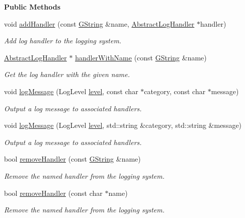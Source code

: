 \begin{Indent}\textbf{ Public Methods}\par
\begin{DoxyCompactItemize}
\item 
void \mbox{\hyperlink{classrev_1_1_logger_a3079f8111b72c4104c9fd23761515646}{add\+Handler}} (const \mbox{\hyperlink{classrev_1_1_g_string}{G\+String}} \&name, \mbox{\hyperlink{classrev_1_1_abstract_log_handler}{Abstract\+Log\+Handler}} $\ast$handler)
\begin{DoxyCompactList}\small\item\em Add log handler to the logging system. \end{DoxyCompactList}\item 
\mbox{\hyperlink{classrev_1_1_abstract_log_handler}{Abstract\+Log\+Handler}} $\ast$ \mbox{\hyperlink{classrev_1_1_logger_a2434316a6f883204891525ea7cdfa769}{handler\+With\+Name}} (const \mbox{\hyperlink{classrev_1_1_g_string}{G\+String}} \&name)
\begin{DoxyCompactList}\small\item\em Get the log handler with the given name. \end{DoxyCompactList}\item 
void \mbox{\hyperlink{classrev_1_1_logger_a4d30225c80b39e4ff5e9e77640994e1c}{log\+Message}} (Log\+Level \mbox{\hyperlink{classrev_1_1_logger_a9fb93878a5b8e3e9367078a1446128b2}{level}}, const char $\ast$category, const char $\ast$message)
\begin{DoxyCompactList}\small\item\em Output a log message to associated handlers. \end{DoxyCompactList}\item 
void \mbox{\hyperlink{classrev_1_1_logger_a2bfdc837fa2305ec8c795d31d5e7426f}{log\+Message}} (Log\+Level \mbox{\hyperlink{classrev_1_1_logger_a9fb93878a5b8e3e9367078a1446128b2}{level}}, std\+::string \&category, std\+::string \&message)
\begin{DoxyCompactList}\small\item\em Output a log message to associated handlers. \end{DoxyCompactList}\item 
bool \mbox{\hyperlink{classrev_1_1_logger_aae9cb77b07f27359538ababa7719f42d}{remove\+Handler}} (const \mbox{\hyperlink{classrev_1_1_g_string}{G\+String}} \&name)
\begin{DoxyCompactList}\small\item\em Remove the named handler from the logging system. \end{DoxyCompactList}\item 
bool \mbox{\hyperlink{classrev_1_1_logger_aa04bfef6e956c16509a726acfa392882}{remove\+Handler}} (const char $\ast$name)
\begin{DoxyCompactList}\small\item\em Remove the named handler from the logging system. \end{DoxyCompactList}\end{DoxyCompactItemize}
\end{Indent}
